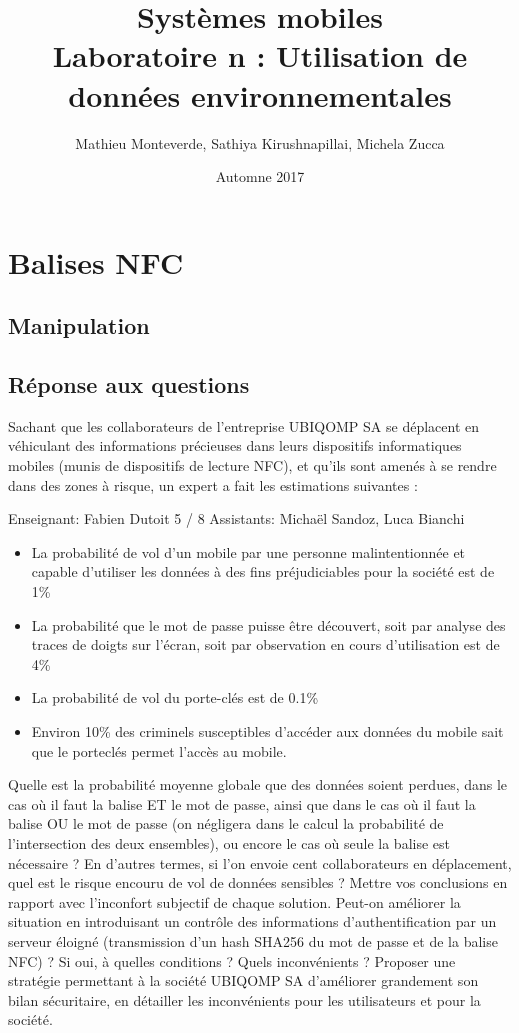 \documentclass[francais,12pt]{article}
\title{Systèmes mobiles \\ Laboratoire n\textordmasculine3 : Utilisation de données environnementales}
\author{Mathieu Monteverde, Sathiya Kirushnapillai, Michela Zucca}
\date{Automne 2017}
\begin{document}
	
	\maketitle
	
	\setlength{\parskip}{1em}
	
	\section*{Balises NFC}
	\subsection*{Manipulation}
	\subsection*{Réponse aux questions}
	Sachant que les collaborateurs de l'entreprise UBIQOMP SA se déplacent en véhiculant des informations précieuses dans leurs dispositifs informatiques mobiles (munis de dispositifs de lecture NFC), et qu'ils sont amenés à se rendre dans des zones à risque, un expert a fait les estimations suivantes : 
	
	Enseignant: Fabien Dutoit 5 / 8 Assistants: Michaël Sandoz, Luca Bianchi 
	\begin{itemize}
		\item La probabilité de vol d'un mobile par une personne malintentionnée et capable d'utiliser les données à des fins préjudiciables pour la société est de 1\% 
		\item La probabilité que le mot de passe puisse être découvert, soit par analyse des traces de doigts sur l'écran, soit par observation en cours d'utilisation est de 4\% 
		\item La probabilité de vol du porte-clés est de 0.1\%  
		\item Environ 10\% des criminels susceptibles d'accéder aux données du mobile sait que le porteclés permet l’accès au mobile.
	\end{itemize}

	 Quelle est la probabilité moyenne globale que des données soient perdues, dans le cas où il faut la balise ET le mot de passe, ainsi que dans le cas où il faut la balise OU le mot de passe (on négligera dans le calcul la probabilité de l’intersection des deux ensembles), ou encore le cas où seule la balise est nécessaire ? En d'autres termes, si l'on envoie cent collaborateurs en déplacement, quel est le risque encouru de vol de données sensibles ? Mettre vos conclusions en rapport avec l'inconfort subjectif de chaque solution. Peut-on améliorer la situation en introduisant un contrôle des informations d'authentification par un serveur éloigné (transmission d'un hash SHA256 du mot de passe et de la balise NFC) ? Si oui, à quelles conditions ? Quels inconvénients ? Proposer une stratégie permettant à la société UBIQOMP SA d'améliorer grandement son bilan sécuritaire, en détailler les inconvénients pour les utilisateurs et pour la société. 
	 
\end{document}
